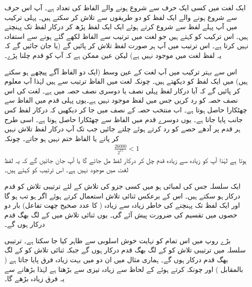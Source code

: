 ایک لغت میں کسی ایک حرف سے شروع ہونے والے الفاظ کی تعداد   ہے۔ آپ اس حرف سے شروع ہونے والے ایک لفظ کو دو طریقوں سے تلاش کر سکتے ہیں۔ پہلی ترکیب میں آپ پہلے لفظ سے شروع کرتے ہوئے ایک ایک لفظ پڑھ کر درکار لفظ تک پہنچتے ہیں۔ اس ترکیب کو  کہتے ہیں جو لغت میں ترتیب سے الفاظ لکھے گئے ہونے سے استفادہ نہیں کرتا ہے۔ اس ترتیب میں آپ ہر صورت لفظ تلاش کر پائیں گے (یا جان جائیں گے کہ یہ لفظ لغت میں موجود نہیں ہے) لیکن عین ممکن ہے کہ آپ کو  قدم چلنا پڑے۔

اس سے بہتر ترکیب میں آپ لغت کے عین وسط (ایک دو الفاظ آگے پیچھے ہو سکتے ہیں) میں ایک لفظ کو دیکھتے ہیں۔ چونکہ لغت میں الفاظ ترتیب سے ہیں لہٰذا آپ معلوم کر پائیں گے کہ آیا درکار لفظ پہلی نصف یا دوسری نصف حصہ میں ہے۔ لغت کی اس نصف حصہ کو رد کریں جس میں لفظ موجود نہیں ہے۔یوں پہلی قدم میں  الفاظ سے چھٹکارا حاصل ہوتا ہے۔  اب منتخب حصہ کے نصف میں جا کر دیکھیں کہ درکار لفظ کس جانب پایا جاتا ہے۔ یوں دوسرے قدم میں  الفاظ سے چھٹکارا حاصل ہوتا ہے۔ اسی طرح ہر قدم پر آدھے حصے کو رد کرتے ہوئے چلتے جائیں جب تک آپ درکار لفظ تلاش نہیں کر پاتے یا الفاظ ختم نہیں ہو جاتے۔ چونکہ
\begin{align*}
\frac{26000}{2^{15}}<1
\end{align*}
ہوتا ہے لہٰذا  آپ کو زیادہ سے زیادہ  قدم چل کر درکار لفظ مل جائے گا یا آپ جان جائیں گے کہ یہ لفظ لغت میں موجود نہیں ہے۔ اس ترتیب کو  کہتے ہیں۔

ایک سلسلہ جس کی لمبائی  ہو میں کسی جزو کی تلاش کے لئے ترتیبی تلاش کو  قدم درکار ہو سکتے ہیں۔ اس کے برعکس ثنائی تلاش استعمال کرتے ہوئے  اگر  ہو تب  ہو گا اور ایک لفظ تک پہنچنے کی خاطر زیادہ سے زیادہ  ( کا عدد صحیح چھت تفاعل)  بار دو حصوں میں تقسیم کی ضرورت پیش آئے گی۔ یوں ثنائی تلاش میں   کے لگ بھگ  قدم درکار ہوں گے۔ 

بڑے  روپ میں اس تمام کو نہایت خوش اسلوبی سے ظاہر کیا جا سکتا ہے۔ ترتیبی سلسلہ میں ترتیبی تلاش کو  کے لگ بھگ قدم درکار ہوں گے جبکہ ثنائی تلاش کو  کے لگ بھگ قدم درکار ہوں گے۔ ہماری مثال میں ان دو میں بہت زیادہ فرق پایا جاتا ہے ( بالمقابل ) اور چونکہ  کرتے ہوئے  کے لحاظ سے  زیادہ تیزی سے بڑھتا ہے لہٰذا  بڑھانے سے یہ فرق زیادہ بڑھے گا۔



